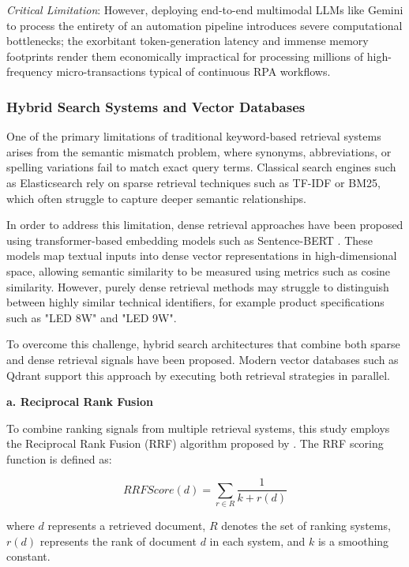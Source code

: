 \textit{Critical Limitation}: However, deploying end-to-end multimodal LLMs like Gemini to process the entirety of an automation pipeline introduces severe computational bottlenecks; the exorbitant token-generation latency and immense memory footprints render them economically impractical for processing millions of high-frequency micro-transactions typical of continuous RPA workflows.

\subsubsection{Hybrid Search Systems and Vector Databases}
One of the primary limitations of traditional keyword-based retrieval systems arises from the semantic mismatch problem, where synonyms, abbreviations, or spelling variations fail to match exact query terms. Classical search engines such as Elasticsearch rely on sparse retrieval techniques such as TF-IDF or BM25, which often struggle to capture deeper semantic relationships.

In order to address this limitation, dense retrieval approaches have been proposed using transformer-based embedding models such as Sentence-BERT \parencite{reimers2019sentence}. These models map textual inputs into dense vector representations in high-dimensional space, allowing semantic similarity to be measured using metrics such as cosine similarity. However, purely dense retrieval methods may struggle to distinguish between highly similar technical identifiers, for example product specifications such as "LED 8W" and "LED 9W".

To overcome this challenge, hybrid search architectures that combine both sparse and dense retrieval signals have been proposed. Modern vector databases such as Qdrant \parencite{qdrant} support this approach by executing both retrieval strategies in parallel.

\textbf{a. Reciprocal Rank Fusion }

To combine ranking signals from multiple retrieval systems, this study employs the Reciprocal Rank Fusion (RRF) algorithm proposed by \textcite{cormack2009reciprocal}. The RRF scoring function is defined as:

\begin{equation*}
    RRFScore(d) = \sum_{r \in R} \frac{1}{k + r(d)}
\end{equation*}

where $d$ represents a retrieved document, $R$ denotes the set of ranking systems, $r(d)$ represents the rank of document $d$ in each system, and $k$ is a smoothing constant.

